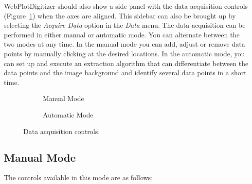 \documentclass[letterpaper, 11pt]{article}
\begin{document}
WebPlotDigitizer should also show a side panel with the data acquisition controls (Figure~\ref{fig:acquireData}) when the axes are aligned. This sidebar can also be brought up by selecting the \emph{Acquire Data} option in the \emph{Data} menu. The data acquisition can be performed in either manual or automatic mode. You can alternate between the two modes at any time. In the manual mode you can add, adjust or remove data points by manually clicking at the desired locations. In the automatic mode, you can set up and execute an extraction algorithm that can differentiate between the data points and the image background and identify several data points in a short time.

\begin{figure}
\centering
{
\begin{subfigure}{0.35\textwidth}
\caption{Manual Mode}
\end{subfigure}
\hspace{5mm}
\begin{subfigure}{0.4\textwidth}
\caption{Automatic Mode}
\end{subfigure}
}
\caption{Data acquisition controls.}
\label{fig:acquireData}
\end{figure}

\subsection{Manual Mode}
The controls available in this mode are as follows:
\end{document}
